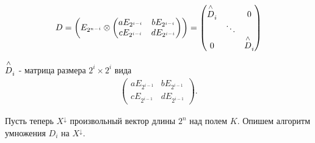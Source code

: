 \begin{align*}
    D = \left( E_{2^{n-i}} \otimes
    \begin{pmatrix}
        aE_{2^{i-i}} & bE_{2^{i-i}}\\
        cE_{2^{i-i}} & dE_{2^{i-i}}
    \end{pmatrix}
    \right)
    =
    \begin{pmatrix}
        \overset{\wedge}{\mathstrut D}_i &  & 0 \\
        & \ddots & \\
        0 & & \overset{\wedge}{\mathstrut D}_i
    \end{pmatrix}
\end{align*}

$\overset{\wedge}{\mathstrut D}_i$ - матрица размера $2^i \times 2^i$ вида
\begin{align*}
    \begin{pmatrix}
        aE_{2^{i-1}} & bE_{2^{i-1}}\\
        cE_{2^{i-1}} & dE_{2^{i-1}}
    \end{pmatrix}.
\end{align*}

Пусть теперь $X^\downarrow$ произвольный вектор длины $2^n$ над полем $K$. Опишем алгоритм умножения $D_i$ на $X^\downarrow$.

